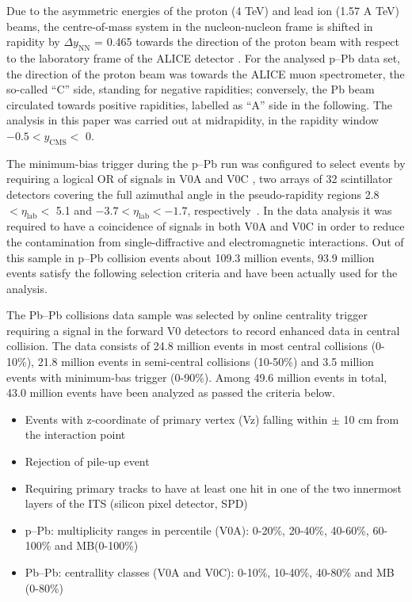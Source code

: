 Due to the asymmetric energies of the proton (4 TeV) and lead ion (1.57 A TeV) beams, the centre-of-mass system in the nucleon-nucleon frame is shifted in rapidity by $\Delta y_{\mathrm{NN}}$ = 0.465 towards the 
direction of the proton beam with respect to the laboratory frame of the ALICE detector \cite{cite:KphipPb}. 
For the analysed p--Pb data set, the direction of the proton beam was towards the ALICE muon spectrometer,
the so-called ``C'' side, standing for negative rapidities; conversely, the Pb beam circulated towards 
positive rapidities, labelled as ``A'' side in the following. The analysis in this paper was carried out at midrapidity, 
in the rapidity window $-0.5 < y_{\mathrm{CMS}} <$ 0.

The minimum-bias trigger during the p--Pb run was configured to select events by requiring a logical OR 
of signals in V0A and V0C \cite{cite:ALICEPerformance}, two arrays of 32 scintillator detectors 
covering the full azimuthal angle in the pseudo-rapidity regions 2.8 $< \eta_{\mathrm{lab}} <$ 5.1 and 
$-3.7 < \eta_{\mathrm{lab}} < -1.7$, respectively~\cite{cite:rapidity}. In the data analysis it was required to 
have a coincidence of signals in both V0A and V0C in order to reduce the contamination 
from single-diffractive and electromagnetic interactions. Out of this sample in p--Pb collision events about 109.3 million events, 93.9 million events satisfy the following selection criteria and have been actually used for the analysis.  %

The Pb--Pb collisions data sample was selected by online centrality trigger requiring a signal in the forward V0 detectors\cite{cite:centralityPbPb}  to record enhanced data in central collision. The data consists of 24.8 million events in most central collisions (0-10\%), 21.8 million events in semi-central collisions (10-50\%) and 3.5 million events with minimum-bas trigger (0-90\%). Among 49.6 million events in total, 43.0 million events have been analyzed as passed the criteria below. 



\begin{itemize}
\item Events with z-coordinate of primary vertex (Vz) falling within $\pm$ 10 cm from the interaction point  
\item Rejection of pile-up event 
\item Requiring primary tracks to have at least one hit in one of the two innermost layers of the ITS (silicon pixel detector, SPD) 
\item p--Pb: multiplicity ranges in percentile (V0A): 0-20\%, 20-40\%, 40-60\%, 60-100\% and MB(0-100\%) 
\item Pb--Pb: centrallity classes (V0A and V0C): 0-10\%, 10-40\%, 40-80\% and MB (0-80\%)  
\end{itemize}


